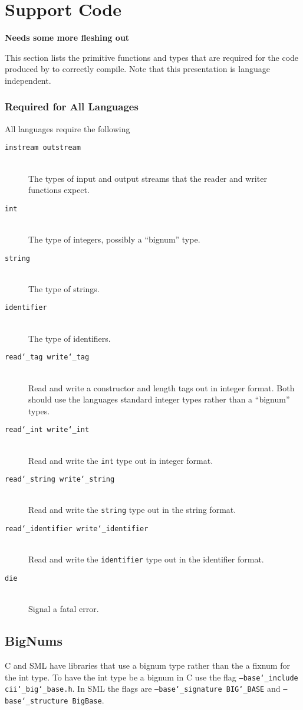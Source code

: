 %
\chapter{Support Code}
\label{chap:support-code}

\textbf{Needs some more fleshing out}

This section lists the primitive functions and types that are required for
the code produced by \asdlgen{} to correctly compile.
Note that this presentation is language independent. 

\subsection{Required for All Languages}
All languages require the following
\newcommand{\ITEM}[1]{\item[\normalfont\color{\cdColor}\texttt{#1}]}
\begin{description}
  \ITEM{instream outstream} \mbox{}\\
    The types of input and output streams that the reader and writer functions expect.
  \ITEM{int} \mbox{}\\
    The type of integers, possibly a ``bignum'' type.
  \ITEM{string} \mbox{}\\
    The type of strings.
  \ITEM{identifier} \mbox{}\\
    The type of identifiers.
  \ITEM{read\char`\_tag write\char`\_tag} \mbox{}\\
    Read and write a constructor and length tags out in \asdl{} integer format.
    Both should use the languages standard integer types rather than a ``bignum'' types.
  \ITEM{read\char`\_int write\char`\_int} \mbox{}\\
    Read and write the \lstinline!int! type out in \asdl{} integer format.
  \ITEM{read\char`\_string write\char`\_string} \mbox{}\\
    Read and write the \lstinline!string! type out in the \asdl{} string format.
  \ITEM{read\char`\_identifier write\char`\_identifier} \mbox{}\\
    Read and write the \lstinline!identifier! type out in the \asdl{} identifier format.
  \ITEM{die} \mbox{}\\
    Signal a fatal error.
\end{description}%

\section{BigNums}
C and SML have libraries that use a bignum type
rather than the a fixnum for the \asdl{} int type. To have the int type
be a bignum in C use the flag \texttt{--base\char`\_include cii\char`\_big\char`\_base.h}. In
SML the flags are \texttt{--base\char`\_signature BIG\char`\_BASE} and
\texttt{--base\char`\_structure BigBase}.

